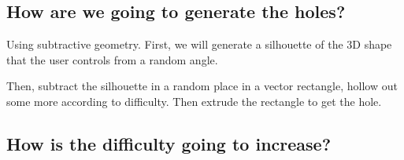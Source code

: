 \documentclass[11pt]{article}
\begin{document}
\subsection{How are we going to generate the holes?}
\label{sec:orgf6ff5df}
Using subtractive geometry. First, we will generate a silhouette of
the 3D shape that the user controls from a random angle.

Then, subtract the silhouette in a random place in a vector rectangle,
hollow out some more according to difficulty. Then extrude the rectangle
to get the hole.

\subsection{How is the difficulty going to increase?}
\label{sec:org662029e}
\end{document}
